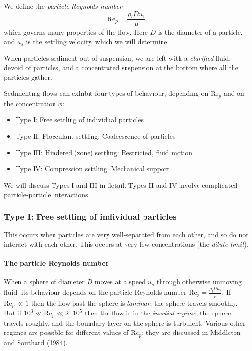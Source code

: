 We define the \textit{particle Reynolds number}
\begin{equation}
    \mathrm{Re}_p = \frac{\rho_l D u_s}{\mu}
\end{equation}
which governs many properties of the flow. Here $D$ is the diameter of a particle, and $u_s$ is the settling velocity, which we will determine. 

When particles sediment out of suspension, we are left with a \textit{clarified} fluid, devoid of particles, and a concentrated suspension at the bottom where all the particles gather. 

Sedimenting flows can exhibit four types of behaviour, depending on $\mathrm{Re}_p$ and on the concentration $\phi$:
\begin{itemize}
    \item Type I: Free settling of individual particles
    \item Type II: Flocculant settling: Coaleescence of particles
    \item Type III: Hindered (zone) settling: Restricted, fluid motion
    \item Type IV: Compression settling: Mechanical support
\end{itemize}
We will discuss Types I and III in detail. Types II and IV involve complicated particle-particle interactions. 

\subsubsection{Type I: Free settling of individual particles} 

This occurs when particles are very well-separated from each other, and so do not interact with each other. This occurs at very low concentrations (the \textit{dilute limit}).

\paragraph{The particle Reynolds number} When a sphere of diameter $D$ moves at a speed $u_s$ through otherwise unmoving fluid, its behaviour depends on the particle Reynolds number $\mathrm{Re}_p=\frac{\rho_lDu_s}{\mu}$.  If $\mathrm{Re}_p\ll1$ then the flow past the sphere is \textit{laminar}; the sphere travels smoothly. But if $10^3 \ll \mathrm{Re}_p \ll 2\cdot10^5$ then the flow is in the \textit{inertial regime}; the sphere travels roughly, and the boundary layer on the sphere is turbulent. Various other regimes are possible for different values of $\mathrm{Re}_p$; they are discussed in Middleton and Southard (1984). 

